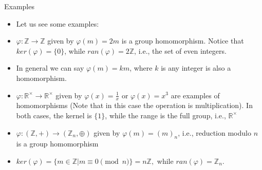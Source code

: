 \documentclass[ %
 10pt, xcolor={dvipsnames,svgnames,x11names,hyperref},
   hyperref={colorlinks=true,citecolor=green,linkcolor=DarkRed,urlcolor=ProcessBlue,anchorcolor=blue}
  ]{beamer}
\newenvironment{stepitemize}{\begin{itemize}[<+->]}{\end{itemize} }
\newcommand{\Z}{\mathbb{Z}}
\newcommand{\R}{\mathbb{R}}
\begin{document}
\begin{frame}{Examples}
\begin{stepitemize}
    \item Let us see some examples:
    \item $\varphi: \Z\rightarrow \Z$ given by $\varphi(m)=2m$
 is a group homomorphism.
Notice that $ker(\varphi) = \{0\}$, while $ran(\varphi) = 2\Z$, i.e., the set of even integers.

 \item In general we can say $\varphi(m)=km$, where $k$ is any integer is also a homomorphism.
 \item $\varphi:\R^{\times} \rightarrow \R^{\times}$ given by $\varphi(x)=\frac{1}{x}$ or $\varphi(x)=x^3$ are examples of homomorphisms (Note that in this case the operation is multiplication). In both cases, the kernel is $\{1\}$, while the range is the full group, i.e., $\R^{\times}$
 \item $\varphi:(\Z,+) \rightarrow (\Z_n, \oplus)$ given by
 $\varphi(m) = (m)_n$, i.e., reduction modulo $n$ is a group homomorphism
 \item $ker(\varphi) = \{m\in \Z| m\equiv 0\pmod{n}\} = n\Z,$
 while $ran(\varphi) = \Z_n$.
\end{stepitemize}

\end{frame}
\end{document}
